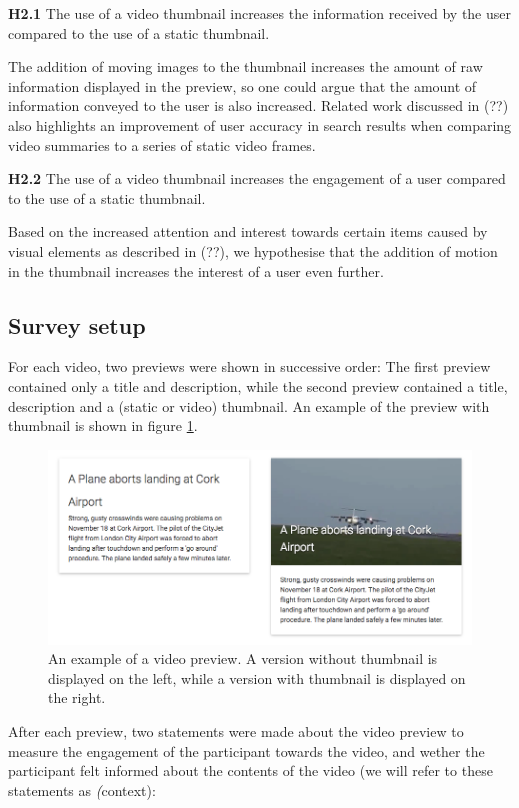 \documentclass{../resources/sig-alternate-05-2015}
\begin{document}
\textbf{H2.1} The use of a video thumbnail increases the information received by the user compared to the use of a static thumbnail.

The addition of moving images to the thumbnail increases the amount of raw information displayed in the preview, so one could argue that the amount of information conveyed to the user is also increased. Related work discussed in (??) also highlights an improvement of user accuracy in search results when comparing video summaries to a series of static video frames.

\textbf{H2.2} The use of a video thumbnail increases the engagement of a user compared to the use of a static thumbnail.

Based on the increased attention and interest towards certain items caused by visual elements as described in (??), we hypothesise that the addition of motion in the thumbnail increases the interest of a user even further.

\subsection{Survey setup}
For each video, two previews were shown in successive order: The first preview contained only a title and description, while the second preview contained a title, description and a (static or video) thumbnail. An example of the preview with thumbnail is shown in figure \ref{survey preview}.

\begin{figure}[h]
  \label{survey preview}
  \includegraphics[width=\linewidth]{resources/preview-combined.png}
  \caption{An example of a video preview. A version without thumbnail is displayed on the left, while a version with thumbnail is displayed on the right.}
\end{figure}


After each preview, two statements were made about the video preview to measure the engagement of the participant towards the video, and wether the participant felt informed about the contents of the video (we will refer to these statements as \textit(context):
\end{document}
